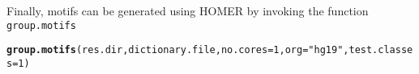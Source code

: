 \documentclass[10pt,oneside]{article}\usepackage[]{graphicx}\usepackage[]{color}
\makeatletter
\newcommand{\hlnum}[1]{\textcolor[rgb]{0.686,0.059,0.569}{#1}}%
\newcommand{\hlstr}[1]{\textcolor[rgb]{0.192,0.494,0.8}{#1}}%
\newcommand{\hlstd}[1]{\textcolor[rgb]{0.345,0.345,0.345}{#1}}%
\newcommand{\hlkwc}[1]{\textcolor[rgb]{0.333,0.667,0.333}{#1}}%
\newcommand{\hlkwd}[1]{\textcolor[rgb]{0.737,0.353,0.396}{\textbf{#1}}}%
\newenvironment{kframe}{%
 \def\at@end@of@kframe{}%
 \ifinner\ifhmode%
  \def\at@end@of@kframe{\end{minipage}}%
  \begin{minipage}{\columnwidth}%
 \fi\fi%
 \def\FrameCommand##1{\hskip\@totalleftmargin \hskip-\fboxsep
 \colorbox{shadecolor}{##1}\hskip-\fboxsep
     \hskip-\linewidth \hskip-\@totalleftmargin \hskip\columnwidth}%
 \MakeFramed {\advance\hsize-\width
   \@totalleftmargin\z@ \linewidth\hsize
   \@setminipage}}%
 {\par\unskip\endMakeFramed%
 \at@end@of@kframe}
\newenvironment{knitrout}{}{} %
\makeatother
\begin{document}
Finally, motifs can be generated using HOMER by invoking the function \texttt{group.motifs}
\begin{knitrout}
\color{fgcolor}\begin{kframe}
\begin{alltt}
\hlkwd{group.motifs}\hlstd{(res.dir, dictionary.file,} \hlkwc{no.cores} \hlstd{=} \hlnum{1}\hlstd{,} \hlkwc{org} \hlstd{=} \hlstr{"hg19"}\hlstd{,} \hlkwc{test.classes} \hlstd{=} \hlnum{1}\hlstd{)}
\end{alltt}
\end{kframe}
\end{knitrout}
\end{document}
